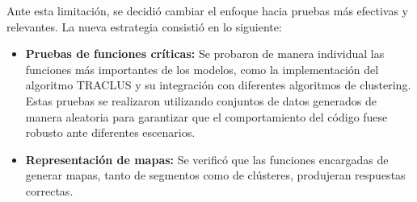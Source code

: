 Ante esta limitación, se decidió cambiar el enfoque hacia pruebas más efectivas y relevantes. La nueva estrategia consistió en lo siguiente:

\begin{itemize}
    \item \textbf{Pruebas de funciones críticas:} Se probaron de manera individual las funciones más importantes de los modelos, como la implementación del algoritmo TRACLUS y su integración con diferentes algoritmos de clustering. Estas pruebas se realizaron utilizando conjuntos de datos generados de manera aleatoria para garantizar que el comportamiento del código fuese robusto ante diferentes escenarios.
    \item \textbf{Representación de mapas:} Se verificó que las funciones encargadas de generar mapas, tanto de segmentos como de clústeres, produjeran respuestas correctas. 
\end{itemize}









